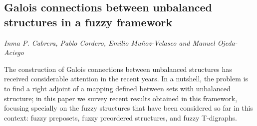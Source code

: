 \documentclass[../booklet.tex]{subfiles}
\begin{document}
\subsection[Galois connections between unbalanced  structures in a fuzzy framework. {\it Inma P. Cabrera, Pablo Cordero, Emilio Muñoz-Velasco and Manuel Ojeda-Aciego}]{Galois connections between unbalanced  structures in a fuzzy framework}
   

\begin{center}
  {\it Inma P. Cabrera, Pablo Cordero, Emilio Muñoz-Velasco and Manuel Ojeda-Aciego}
\end{center}



The construction of Galois connections between unbalanced structures has received considerable attention in the recent years. 
In a nutshell, the problem is to find a right adjoint of a mapping defined between sets with unbalanced structure; in this paper we survey recent results obtained in this framework, focusing specially on    the fuzzy structures that have been considered so far in this context:
   fuzzy preposets, fuzzy preordered structures,      and fuzzy T-digraphs.
 
\end{document}
